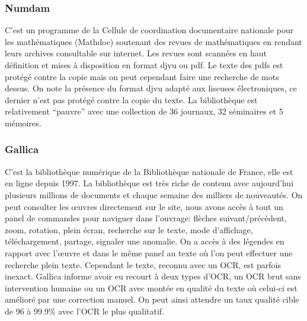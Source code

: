         \subsubsection{Numdam}
        \label{subsubsec:numdam}
        C’est un programme de la Cellule de coordination documentaire nationale pour les mathématiques (Mathdoc) soutenant des revues
        de mathématiques en rendant leurs archives consultable sur internet. Les revues sont scannées en haut définition et mises
        à disposition en format djvu ou pdf. Le texte des pdfs est protégé contre la copie mais on peut cependant faire
        une recherche de mots dessus. On note la présence du format djvu adapté aux liseuses électroniques, ce dernier n’est
        pas protégé contre la copie du texte. La bibliothèque est relativement “pauvre” avec une collection de 36 journaux, 32 séminaires et 5 mémoires.

        \subsubsection{Gallica}
        \label{subsubsec:gallica}
        C’est la bibliothèque numérique de la Bibliothèque nationale de France, elle est en ligne depuis 1997. La bibliothèque
        est très riche de contenu avec aujourd’hui plusieurs millions de documents et chaque semaine des milliers de nouveautés.
        On peut consulter les œuvres directement sur le site, nous avons accès à tout un panel de commandes pour naviguer dans
        l’ouvrage: flèches suivant/précèdent, zoom, rotation, plein écran, recherche sur le texte, mode d’affichage, téléchargement,
        partage, signaler une anomalie. On a accès à des légendes en rapport avec l’œuvre et dans le même panel au texte où l’on
        peut effectuer une recherche plein texte. Cependant le texte, reconnu avec un OCR, est parfois inexact. Gallica informe
        avoir eu recourt à deux types d’OCR, un OCR brut sans intervention humaine ou un OCR avec montée en qualité du texte où
        celui-ci est amélioré par une correction manuel. On peut ainsi attendre un taux qualité cible de 96 à 99.9\% avec l’OCR le plus qualitatif. 

